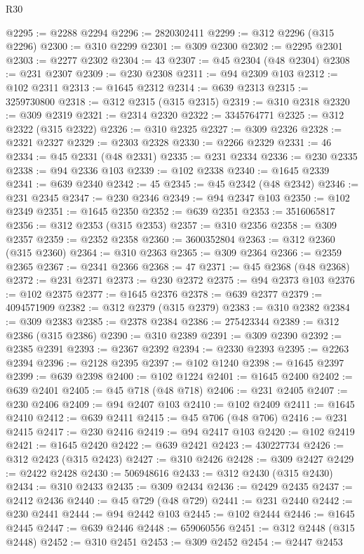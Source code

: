 \begin{lexlean}{R30}
\begin{coremodule}
@2295 := @2288 @2294
@2296 := 2820302411
@2299 := @312 @2296 (@315 @2296)
@2300 := @310 @2299
@2301 := @309 @2300
@2302 := @2295 @2301
@2303 := @2277 @2302
@2304 := 43
@2307 := @45 @2304 (@48 @2304)
@2308 := @231 @2307
@2309 := @230 @2308
@2311 := @94 @2309 @103
@2312 := @102 @2311
@2313 := @1645 @2312
@2314 := @639 @2313
@2315 := 3259730800
@2318 := @312 @2315 (@315 @2315)
@2319 := @310 @2318
@2320 := @309 @2319
@2321 := @2314 @2320
@2322 := 3345764771
@2325 := @312 @2322 (@315 @2322)
@2326 := @310 @2325
@2327 := @309 @2326
@2328 := @2321 @2327
@2329 := @2303 @2328
@2330 := @2266 @2329
@2331 := 46
@2334 := @45 @2331 (@48 @2331)
@2335 := @231 @2334
@2336 := @230 @2335
@2338 := @94 @2336 @103
@2339 := @102 @2338
@2340 := @1645 @2339
@2341 := @639 @2340
@2342 := 45
@2345 := @45 @2342 (@48 @2342)
@2346 := @231 @2345
@2347 := @230 @2346
@2349 := @94 @2347 @103
@2350 := @102 @2349
@2351 := @1645 @2350
@2352 := @639 @2351
@2353 := 3516065817
@2356 := @312 @2353 (@315 @2353)
@2357 := @310 @2356
@2358 := @309 @2357
@2359 := @2352 @2358
@2360 := 3600352804
@2363 := @312 @2360 (@315 @2360)
@2364 := @310 @2363
@2365 := @309 @2364
@2366 := @2359 @2365
@2367 := @2341 @2366
@2368 := 47
@2371 := @45 @2368 (@48 @2368)
@2372 := @231 @2371
@2373 := @230 @2372
@2375 := @94 @2373 @103
@2376 := @102 @2375
@2377 := @1645 @2376
@2378 := @639 @2377
@2379 := 4094571909
@2382 := @312 @2379 (@315 @2379)
@2383 := @310 @2382
@2384 := @309 @2383
@2385 := @2378 @2384
@2386 := 275423344
@2389 := @312 @2386 (@315 @2386)
@2390 := @310 @2389
@2391 := @309 @2390
@2392 := @2385 @2391
@2393 := @2367 @2392
@2394 := @2330 @2393
@2395 := @2263 @2394
@2396 := @2128 @2395
@2397 := @102 @1240
@2398 := @1645 @2397
@2399 := @639 @2398
@2400 := @102 @1224
@2401 := @1645 @2400
@2402 := @639 @2401
@2405 := @45 @718 (@48 @718)
@2406 := @231 @2405
@2407 := @230 @2406
@2409 := @94 @2407 @103
@2410 := @102 @2409
@2411 := @1645 @2410
@2412 := @639 @2411
@2415 := @45 @706 (@48 @706)
@2416 := @231 @2415
@2417 := @230 @2416
@2419 := @94 @2417 @103
@2420 := @102 @2419
@2421 := @1645 @2420
@2422 := @639 @2421
@2423 := 430227734
@2426 := @312 @2423 (@315 @2423)
@2427 := @310 @2426
@2428 := @309 @2427
@2429 := @2422 @2428
@2430 := 506948616
@2433 := @312 @2430 (@315 @2430)
@2434 := @310 @2433
@2435 := @309 @2434
@2436 := @2429 @2435
@2437 := @2412 @2436
@2440 := @45 @729 (@48 @729)
@2441 := @231 @2440
@2442 := @230 @2441
@2444 := @94 @2442 @103
@2445 := @102 @2444
@2446 := @1645 @2445
@2447 := @639 @2446
@2448 := 659060556
@2451 := @312 @2448 (@315 @2448)
@2452 := @310 @2451
@2453 := @309 @2452
@2454 := @2447 @2453

\end{coremodule}
\end{lexlean}
